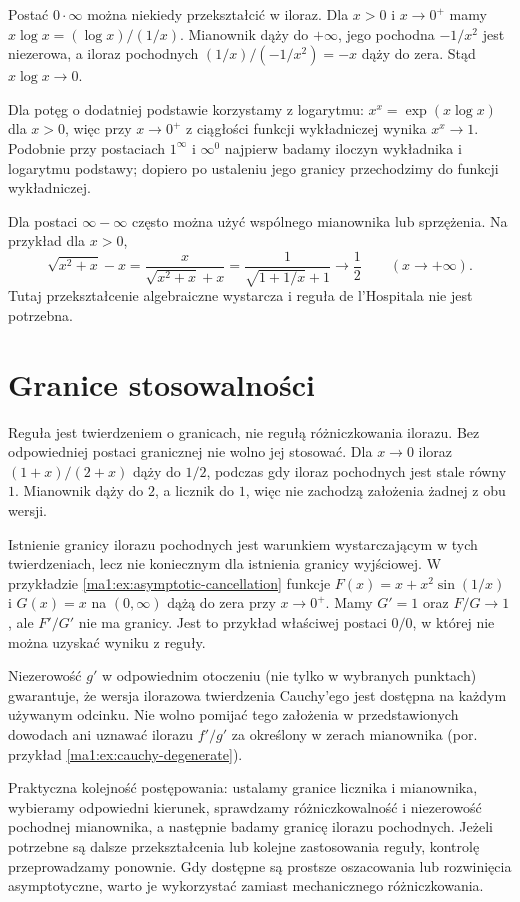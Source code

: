 \begin{przyklad}
\label{ma1:ex:lhopital-transformations}
Postać $0\cdot\infty$ można niekiedy przekształcić w iloraz. Dla $x>0$ i $x\to0^+$ mamy $x\log x=(\log x)/(1/x)$. Mianownik dąży do $+\infty$, jego pochodna $-1/x^2$ jest niezerowa, a iloraz pochodnych $(1/x)/(-1/x^2)=-x$ dąży do zera. Stąd $x\log x\to0$.

Dla potęg o dodatniej podstawie korzystamy z logarytmu: $x^x=\exp(x\log x)$ dla $x>0$, więc przy $x\to0^+$ z ciągłości funkcji wykładniczej wynika $x^x\to1$. Podobnie przy postaciach $1^\infty$ i $\infty^0$ najpierw badamy iloczyn wykładnika i logarytmu podstawy; dopiero po ustaleniu jego granicy przechodzimy do funkcji wykładniczej.

Dla postaci $\infty-\infty$ często można użyć wspólnego mianownika lub sprzężenia. Na przykład dla $x>0$,
\[
 \sqrt{x^2+x}-x=\frac{x}{\sqrt{x^2+x}+x}
 =\frac{1}{\sqrt{1+1/x}+1}\longrightarrow\frac12
 \qquad(x\to+\infty).
\]
Tutaj przekształcenie algebraiczne wystarcza i reguła de l'Hospitala nie jest potrzebna.
\end{przyklad}

\section{Granice stosowalności}
\begin{przyklad}
\label{ma1:ex:lhopital-counterexamples}
Reguła jest twierdzeniem o granicach, nie regułą różniczkowania ilorazu. Bez odpowiedniej postaci granicznej nie wolno jej stosować. Dla $x\to0$ iloraz $(1+x)/(2+x)$ dąży do $1/2$, podczas gdy iloraz pochodnych jest stale równy $1$. Mianownik dąży do $2$, a licznik do $1$, więc nie zachodzą założenia żadnej z obu wersji.

Istnienie granicy ilorazu pochodnych jest warunkiem wystarczającym w tych twierdzeniach, lecz nie koniecznym dla istnienia granicy wyjściowej. W przykładzie \ref{ma1:ex:asymptotic-cancellation} funkcje $F(x)=x+x^2\sin(1/x)$ i $G(x)=x$ na $(0,\infty)$ dążą do zera przy $x\to0^+$. Mamy $G'=1$ oraz $F/G\to1$, ale $F'/G'$ nie ma granicy. Jest to przykład właściwej postaci $0/0$, w której nie można uzyskać wyniku z reguły.

Niezerowość $g'$ w odpowiednim otoczeniu (nie tylko w wybranych punktach) gwarantuje, że wersja ilorazowa twierdzenia Cauchy'ego jest dostępna na każdym używanym odcinku. Nie wolno pomijać tego założenia w przedstawionych dowodach ani uznawać ilorazu $f'/g'$ za określony w zerach mianownika (por. przykład \ref{ma1:ex:cauchy-degenerate}).
\end{przyklad}

Praktyczna kolejność postępowania: ustalamy granice licznika i mianownika, wybieramy odpowiedni kierunek, sprawdzamy różniczkowalność i niezerowość pochodnej mianownika, a następnie badamy granicę ilorazu pochodnych. Jeżeli potrzebne są dalsze przekształcenia lub kolejne zastosowania reguły, kontrolę przeprowadzamy ponownie. Gdy dostępne są prostsze oszacowania lub rozwinięcia asymptotyczne, warto je wykorzystać zamiast mechanicznego różniczkowania.

